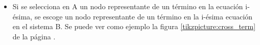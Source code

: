 \begin{itemize}
    \item Si se selecciona en A un nodo representante de un término en la ecuación i-ésima, se escoge un nodo representante de un término en la i-ésima ecuación en el sistema B. Se puede ver como ejemplo la figura \ref{tikzpicture:cross_term} de la página \pageref{tikzpicture:cross_term}.

          \begin{center}




\end{center}
\end{itemize}
